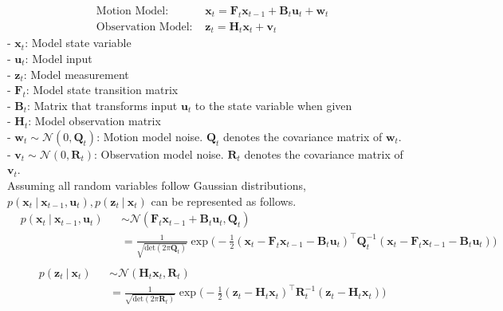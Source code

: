 \documentclass[10pt]{article}
\begin{document}
	\begin{equation}
		\begin{aligned}
			& \text{Motion Model: } & \mathbf{x}_{t} = \mathbf{F}_{t}\mathbf{x}_{t-1} + \mathbf{B}_{t}\mathbf{u}_{t} + \mathbf{w}_{t} \\
			& \text{Observation Model: } & \mathbf{z}_{t} = \mathbf{H}_{t}\mathbf{x}_{t} + \mathbf{v}_{t} 
		\end{aligned}
	\end{equation}
	- $\mathbf{x}_{t}$: Model state variable\\
	- $\mathbf{u}_{t}$: Model input\\
	- $\mathbf{z}_{t}$: Model measurement\\
	- $\mathbf{F}_{t}$: Model state transition matrix\\
	- $\mathbf{B}_{t}$: Matrix that transforms input $\mathbf{u}_{t}$ to the state variable when given\\
	- $\mathbf{H}_{t}$: Model observation matrix\\
	- $\mathbf{w}_{t} \sim \mathcal{N}(0, \mathbf{Q}_{t})$: Motion model noise. $\mathbf{Q}_{t}$ denotes the covariance matrix of $\mathbf{w}_{t}$.\\
	- $\mathbf{v}_{t} \sim \mathcal{N}(0, \mathbf{R}_{t})$: Observation model noise. $\mathbf{R}_{t}$ denotes the covariance matrix of $\mathbf{v}_{t}$.\\
	
	Assuming all random variables follow Gaussian distributions, $p(\mathbf{x}_{t} \ | \ \mathbf{x}_{t-1}, \mathbf{u}_{t}), p(\mathbf{z}_{t} \ | \ \mathbf{x}_{t})$ can be represented as follows.
	\begin{equation}  \label{eq:kf1}
		\begin{aligned}
			& p(\mathbf{x}_{t} \ | \ \mathbf{x}_{t-1}, \mathbf{u}_{t}) && \sim \mathcal{N}(\mathbf{F}_{t}\mathbf{x}_{t-1} + \mathbf{B}_{t}\mathbf{u}_{t}, \mathbf{Q}_{t}) \\
			& && = \frac{1}{ \sqrt{\text{det}(2\pi \mathbf{Q}_t)}}\exp\bigg( -\frac{1}{2}(\mathbf{x}_{t} -\mathbf{F}_{t}\mathbf{x}_{t-1}-\mathbf{B}_{t}\mathbf{u}_t)^{\intercal}\mathbf{Q}_t^{-1}(\mathbf{x}_{t}-\mathbf{F}_{t}\mathbf{x}_{t-1}-\mathbf{B}_{t}\mathbf{u}_{t}) \bigg)\\ 
		\end{aligned}
	\end{equation}
	\begin{equation} \label{eq:kf2}
		\begin{aligned}
			& p(\mathbf{z}_{t} \ | \ \mathbf{x}_{t})  && \sim \mathcal{N}(\mathbf{H}_{t}\mathbf{x}_{t}, \mathbf{R}_{t}) \\
			& && = \frac{1}{ \sqrt{\text{det}(2\pi \mathbf{R}_t)}}\exp\bigg( -\frac{1}{2}(\mathbf{z}_{t}-\mathbf{H}_{t}\mathbf{x}_{t})^{\intercal}\mathbf{R}_{t}^{-1}(\mathbf{z}_{t}-\mathbf{H}_{t}\mathbf{x}_{t}) \bigg)
		\end{aligned}
	\end{equation}
	
\end{document}
